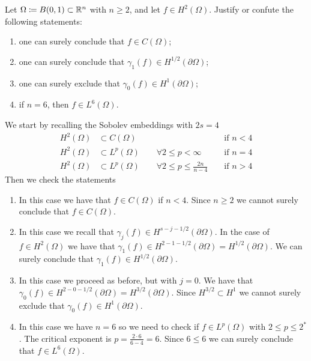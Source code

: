 \newpage
\begin{exercise}
    Let \(\Omega \coloneqq B(0, 1) \subset \mathbb{R}^n\) with \(n \geq 2\), and let \(f \in H^2(\Omega)\). Justify or confute the following statements:
    \begin{enumerate}
        \item one can surely conclude that \(f \in C(\Omega)\);
        \item one can surely conclude that \(\gamma_1(f) \in H^{1/2}(\partial\Omega)\);
        \item one can surely exclude that \(\gamma_0(f) \in H^{1}(\partial\Omega)\);
        \item if \(n = 6\), then \(f \in L^{6}(\Omega)\).
    \end{enumerate}
\end{exercise}
We start by recalling the Sobolev embeddings with \(2s = 4\)
\begin{align*}
    H^2(\Omega) &\subset C(\Omega) && \text{ if } n < 4 \\
    H^2(\Omega) &\subset L^p(\Omega) \qquad \forall 2 \leq p < \infty && \text{ if } n = 4 \\
    H^2(\Omega) &\subset L^p(\Omega) \qquad \forall 2 \leq p \leq \frac{2n}{n - 4} && \text{ if } n > 4
\end{align*}
Then we check the statements
\begin{enumerate}
    \item In this case we have that \(f \in C(\Omega)\) if \(n < 4\). Since \(n \geq 2\) we cannot surely conclude that \(f \in C(\Omega)\).
    \item In this case we recall that \(\gamma_j(f) \in H^{s - j - 1/2}(\partial\Omega)\). In the case of \(f \in H^2(\Omega)\) we have that \(\gamma_1(f) \in H^{2 - 1 - 1/2}(\partial\Omega) = H^{1/2}(\partial\Omega)\). We can surely conclude that \(\gamma_1(f) \in H^{1/2}(\partial\Omega)\).
    \item In this case we proceed as before, but with \(j = 0\). We have that \(\gamma_0(f) \in H^{2 - 0 - 1/2}(\partial\Omega) = H^{3/2}(\partial\Omega)\). Since \(H^{3/2} \subset H^1\) we cannot surely exclude that \(\gamma_0(f) \in H^{1}(\partial\Omega)\).
    \item In this case we have \(n = 6\) so we need to check if \(f \in L^p(\Omega)\) with \(2\leq p \leq 2^*\). The critical exponent is \(p = \frac{2\cdot 6}{6 - 4} = 6\). Since \(6 \leq 6\) we can surely conclude that \(f \in L^{6}(\Omega)\). 
\end{enumerate}

